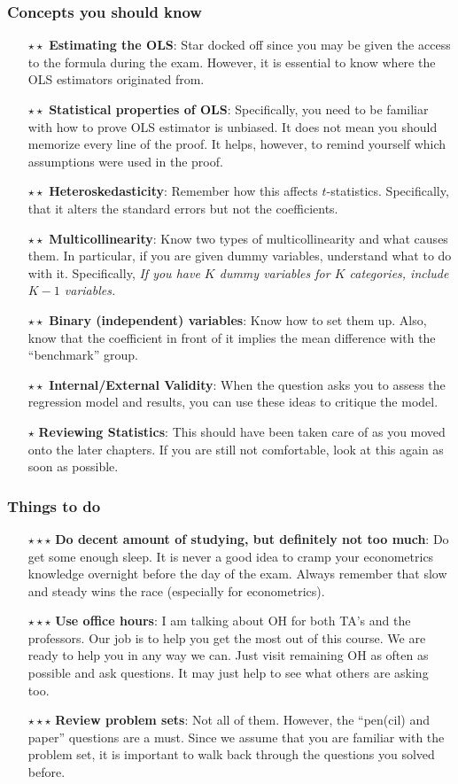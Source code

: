 \documentclass[aspectratio=169]{beamer}
\begin{document}
\begin{frame}
\frametitle{Concepts you should know}
\begin{itemize} 
\item[$\star\star$] \textbf{Estimating the OLS}: Star docked off since you may be given the access to the formula during the exam. However, it is essential to know where the OLS estimators originated from. 
\item[$\star\star$] \textbf{Statistical properties of OLS}: Specifically, you need to be familiar with how to prove OLS estimator is unbiased. It does not mean you should memorize every line of the proof. It helps, however, to remind yourself which assumptions were used in the proof.
\item[$\star\star$]\textbf{Heteroskedasticity}: Remember how this affects $t$-statistics. Specifically, that it alters the standard errors but not the coefficients.  
\item[$\star\star$]\textbf{Multicollinearity}: Know two types of multicollinearity and what causes them. In particular, if you are given dummy variables, understand what to do with it. Specifically, \textit{If you have $K$ dummy variables for $K$ categories, include $K-1$ variables.}
\item[$\star\star$]\textbf{Binary (independent) variables}: Know how to set them up. Also, know that the coefficient in front of it implies the mean difference with the ``benchmark'' group.
\item[$\star\star$]\textbf{Internal/External Validity}: When the question asks you to assess the regression model and results, you can use these ideas to critique the model. 
\item[$\star$]\textbf{Reviewing Statistics}: This should have been taken care of as you moved onto the later chapters. If you are still not comfortable, look at this again as soon as possible. 
\end{itemize}
\end{frame}

\begin{frame}
\frametitle{Things to do}
\begin{itemize} 
\item[$\star\star\star$] \textbf{Do decent amount of studying, but definitely not too much}: Do get some enough sleep. It is never a good idea to cramp your econometrics knowledge overnight before the day of the exam. Always remember that slow and steady wins the race (especially for econometrics). 
\item[$\star\star\star$] \textbf{Use office hours}: I am talking about OH for both TA's and the professors. Our job is to help you get the most out of this course. We  are ready to help you in any way we can. Just visit remaining OH as often as possible and ask questions. It may just help to see what others are asking too.
\item[$\star\star\star$]\textbf{Review problem sets}: Not all of them. However, the ``pen(cil) and paper'' questions are a must. Since we assume that you are familiar with the problem set, it is important to walk back through the questions you solved before. 
\end{itemize}
\end{frame}
\end{document}
